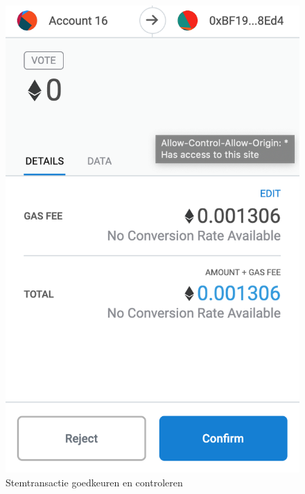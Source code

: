 \begin{figure}
		\includegraphics[width=\linewidth/3]{img/screen_metamask5.png}
		\caption{Stemtransactie goedkeuren en controleren}
		\label{fig:screen_voting2}
	\end{figure}
